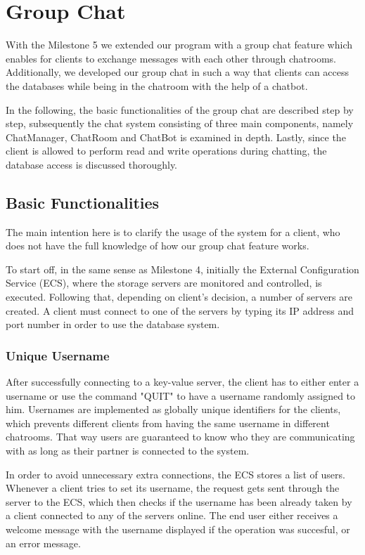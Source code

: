\section{Group Chat}
\label{sec:groupchat}
With the Milestone 5 we extended our program with a group chat feature which enables for clients to exchange messages with each other through chatrooms. Additionally, we developed our group chat in such a way that clients can access the databases while being in the chatroom with the help of a chatbot.
 
In the following, the basic functionalities of the group chat are described step by step, subsequently the chat system consisting of three main components, namely ChatManager, ChatRoom and ChatBot is examined in depth. Lastly, since the client is allowed to perform read and write operations during chatting, the database access is discussed thoroughly.  

\subsection{Basic Functionalities}
\label{sec:groupchat_functionalities}
The main intention here is to clarify the usage of the system for a client, who does not have the full knowledge of how our group chat feature works.

To start off, in the same sense as Milestone 4, initially the External Configuration Service (ECS), where the storage servers are monitored and controlled, is executed. Following that, depending on client's decision, a number of servers are created. A client must connect to one of the servers by typing its IP address and port number in order to use the database system.

\subsubsection{Unique Username}
\label{sec:groupchat_funtionalities_uniqueusername}
After successfully connecting to a key-value server, the client has to either enter a username or use the command "QUIT" to have a username randomly assigned to him. Usernames are implemented as globally unique identifiers for the clients, which prevents different clients from having the same username in different chatrooms. That way users are guaranteed to know who they are communicating with as long as their partner is connected to the system. 

In order to avoid unnecessary extra connections, the ECS stores a list of users. Whenever a client tries to set its username, the request gets sent through the server to the ECS, which then checks if the username has been already taken by a client connected to any of the servers online. The end user either receives a welcome message with the username displayed if the operation was succesful, or an error message.
 
